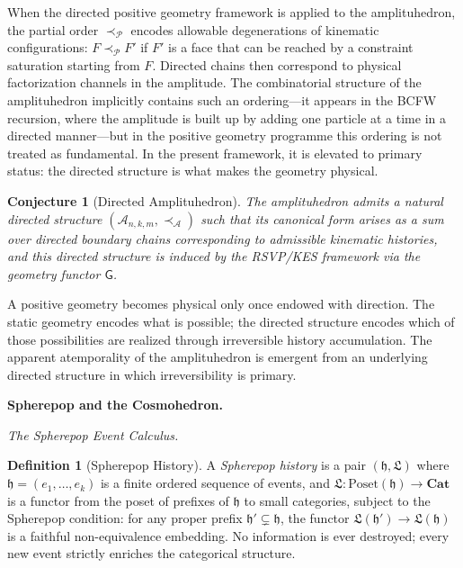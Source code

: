 \documentclass[11pt]{article}
\theoremstyle{plain}
\newtheorem{conjecture}[theorem]{Conjecture}
\theoremstyle{definition}
\newtheorem{definition}[theorem]{Definition}
\theoremstyle{remark}
\newcommand{\hist}{\mathfrak{h}}
\newcommand{\Log}{\mathfrak{L}}
\newcommand{\Gfun}{\mathsf{G}}
\begin{document}
When the directed positive geometry framework is applied to the amplituhedron, the partial order $\prec_{\mathcal{P}}$ encodes allowable degenerations of kinematic configurations: $F \prec_{\mathcal{P}} F'$ if $F'$ is a face that can be reached by a constraint saturation starting from $F$. Directed chains then correspond to physical factorization channels in the amplitude. The combinatorial structure of the amplituhedron implicitly contains such an ordering---it appears in the BCFW recursion, where the amplitude is built up by adding one particle at a time in a directed manner---but in the positive geometry programme this ordering is not treated as fundamental. In the present framework, it is elevated to primary status: the directed structure is what makes the geometry physical.

\begin{conjecture}[Directed Amplituhedron]
\label{conj:directed-amplituhedron}
The amplituhedron admits a natural directed structure $(\mathcal{A}_{n,k,m}, \prec_{\mathcal{A}})$ such that its canonical form arises as a sum over directed boundary chains corresponding to admissible kinematic histories, and this directed structure is induced by the RSVP/KES framework via the geometry functor $\Gfun$.
\end{conjecture}

A positive geometry becomes physical only once endowed with direction. The static geometry encodes what is possible; the directed structure encodes which of those possibilities are realized through irreversible history accumulation. The apparent atemporality of the amplituhedron is emergent from an underlying directed structure in which irreversibility is primary.

\bigskip\noindent\textbf{Spherepop and the Cosmohedron.}
\label{sec:spherepop}

\medskip\noindent\textit{The Spherepop Event Calculus.}

\begin{definition}[Spherepop History]
A \emph{Spherepop history} is a pair $(\hist, \Log)$ where $\hist = (e_1, \ldots, e_k)$ is a finite ordered sequence of events, and $\Log: \mathrm{Poset}(\hist) \to \mathbf{Cat}$ is a functor from the poset of prefixes of $\hist$ to small categories, subject to the Spherepop condition: for any proper prefix $\hist' \subsetneq \hist$, the functor $\Log(\hist') \to \Log(\hist)$ is a faithful non-equivalence embedding. No information is ever destroyed; every new event strictly enriches the categorical structure.
\end{definition}
\end{document}
